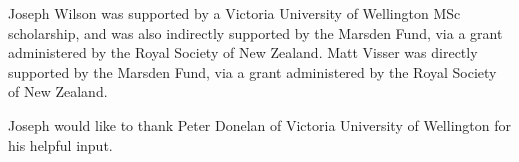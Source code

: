 \documentclass[12pt,a4paper]{article}
\begin{document}
\acknowledgments

Joseph Wilson was supported by a Victoria University of Wellington MSc scholarship, and was also indirectly supported by the Marsden Fund, via a grant administered by the Royal Society of New Zealand.
Matt Visser was directly supported by the Marsden Fund, via a grant
administered by the Royal Society of New Zealand.

Joseph would like to thank Peter Donelan of Victoria University of Wellington for his helpful input.



\end{document}
